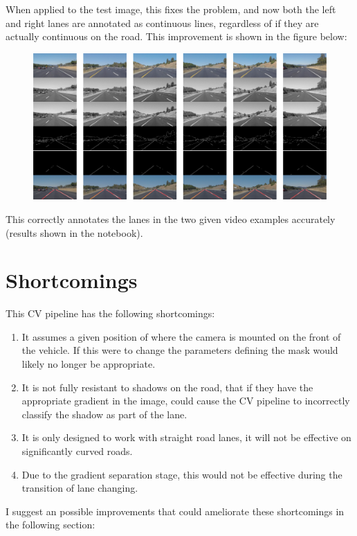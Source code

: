\documentclass[letterpaper,12pt]{article}
\begin{document}
\noindent When applied to the test image, this fixes the problem, and now both the left and right lanes are annotated as continuous lines, regardless of if they are actually continuous on the road. This improvement is shown in the figure below:
\FloatBarrier
\begin{figure}
\centering
\includegraphics[width=1.0\columnwidth]{fig2_clean.pdf}
\label{fig:figure}
\end{figure}
\FloatBarrier

This correctly annotates the lanes in the two given video examples accurately (results shown in the notebook).
\section{Shortcomings}
This CV pipeline has the following shortcomings:
\begin{enumerate}
\item It assumes a given position of where the camera is mounted on the front of the vehicle. If this were to change the parameters defining the mask would likely no longer be appropriate.
\item It is not fully resistant to shadows on the road, that if they have the appropriate gradient in the image, could cause the CV pipeline to incorrectly classify the shadow as part of the lane.
\item It is only designed to work with straight road lanes, it will not be effective on significantly curved roads.
\item Due to the gradient separation stage, this would not be effective during the transition of lane changing.
\end{enumerate}
I suggest an possible improvements that could ameliorate these shortcomings in the following section:
\end{document}
